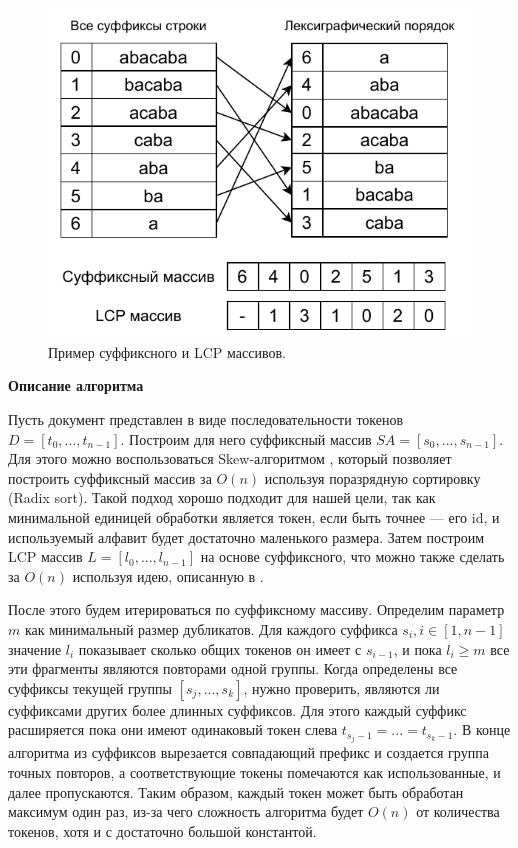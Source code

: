 \documentclass[14pt]{matmex-diploma-custom}
\begin{document}
\begin{figure}[h!]
	\includegraphics[scale=1.25]{pictures/SA-LCP.pdf}
	\centering
	\caption{Пример суффиксного и LCP массивов.}
	\label{fig:SA-LCP}
\end{figure}

\textbf{Описание алгоритма}

Пусть документ представлен в виде последовательности токенов $D = [t_0,...,t_{n-1}]$. Построим для него суффиксный массив $SA = [s_0,...,s_{n-1}]$. Для этого можно воспользоваться Skew-алгоритмом \cite{bib:art:SkewAlg}, который позволяет построить суффиксный массив за $O(n)$ используя поразрядную сортировку (Radix sort). Такой подход хорошо подходит для нашей цели, так как минимальной единицей обработки является токен, если быть точнее --- его id, и используемый алфавит будет достаточно маленького размера. Затем построим LCP массив $L = [l_0,...,l_{n-1}]$ на основе суффиксного, что можно также сделать за $O(n)$ используя идею, описанную в \cite{bib:art:LCPArray}.

После этого будем итерироваться по суффиксному массиву. Определим параметр $m$ как минимальный размер дубликатов. Для каждого суффикса $s_i, i \in [1,n-1]$ значение $l_i$ показывает сколько общих токенов он имеет с $s_{i-1}$, и пока $l_i \ge m$ все эти фрагменты являются повторами одной группы. Когда определены все суффиксы текущей группы $[s_j,...,s_k]$, нужно проверить, являются ли суффиксами других более длинных суффиксов. Для этого каждый суффикс расширяется пока они имеют одинаковый токен слева $t_{s_j - 1} = ... = t_{s_k - 1}$. В конце алгоритма из суффиксов вырезается совпадающий префикс и создается группа точных повторов, а соответствующие токены помечаются как использованные, и далее пропускаются. Таким образом, каждый токен может быть обработан максимум один раз, из-за чего сложность алгоритма будет $O(n)$ от количества токенов, хотя и с достаточно большой константой.
\end{document}
